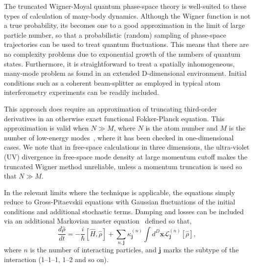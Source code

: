 \documentclass[aps,prl,twocolumn,showpacs,amsmath,amssymb,superscriptaddress]{revtex4-1}
\newcommand{\xvec}{\boldsymbol{x}}
\newcommand{\jvec}{\boldsymbol{j}}
\begin{document}
The truncated Wigner-Moyal quantum phase-space theory is well-suited
to these types of calculation of many-body dynamics.
Although the Wigner function is not a true probability,
its becomes one to a good approximation in the limit of large particle number,
so that a probabilistic (random) sampling of phase-space trajectories
can be used to treat quantum fluctuations.
This means that there are no complexity problems due to exponential growth
of the numbers of quantum states.
Furthermore, it is straightforward to treat a spatially inhomogeneous,
many-mode problem as found in an extended D-dimensional environment.
Initial conditions such as a coherent beam-splitter
as employed in typical atom interferometry experiments can be readily included.

This approach does require an approximation of truncating third-order derivatives
in an otherwise exact functional Fokker-Planck equation.
This approximation is valid when $N \gg M$, where $N$ is the atom number and
$M$ is the number of low-energy modes~\cite{Drummond1993,Sinatra2002,Norrie2006},
where it has been checked in one-dimensional cases.
We note that in free-space calculations in three dimensions,
the ultra-violet (UV) divergence in free-space mode density at large momentum cutoff
makes the truncated Wigner method unreliable,
unless a momentum truncation is used so that $N \gg M$.

In the relevant limits where the technique is applicable,
the equations simply reduce to Gross-Pitaevskii equations with Gaussian fluctuations
of the initial conditions and additional stochastic terms.
Damping and losses can be included via an additional Markovian master equation~\cite{Jack2002}
defined so that,
\begin{equation}
	\frac{d\hat{\rho}}{dt} = -\frac{i}{\hbar} \left[ \hat{H}, \hat{\rho} \right] +
	\sum_{n,\jvec} \kappa_{\jvec}^{(n)}
	\int d^D\xvec \mathcal{L}_{\jvec}^{(n)} \left[ \hat{\rho} \right],
\end{equation}
where $n$ is the number of interacting particles,
and $\jvec$ marks the subtype of the interaction (1--1--1, 1--2 and so on).
\end{document}
